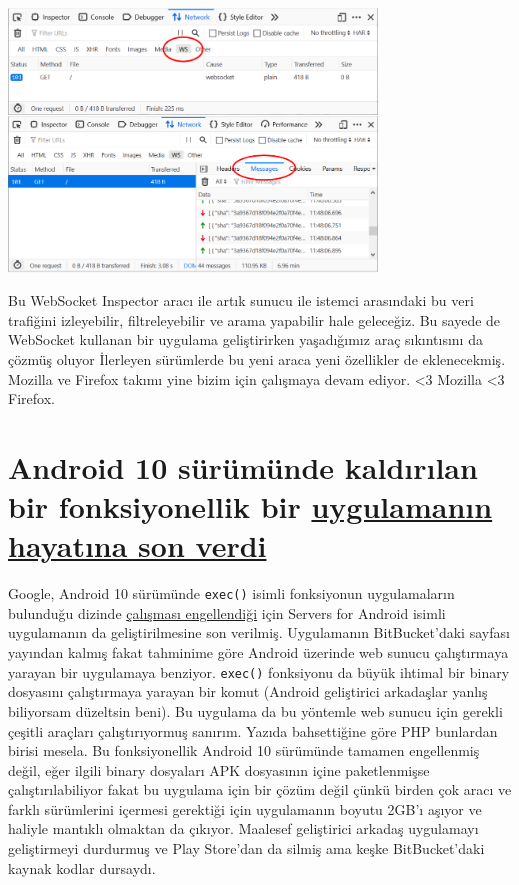 \documentclass[11pt]{article}
\begin{document}
\begin{center}
\includegraphics[height=7cm]{gorseller/websocket-inspector.png}
\end{center}

Bu WebSocket Inspector aracı ile artık sunucu ile istemci arasındaki bu veri
trafiğini izleyebilir, filtreleyebilir ve arama yapabilir hale geleceğiz. Bu
sayede de WebSocket kullanan bir uygulama geliştirirken yaşadığımız araç
sıkıntısını da çözmüş oluyor İlerleyen sürümlerde bu yeni araca yeni özellikler
de eklenecekmiş. Mozilla ve Firefox takımı yine bizim için çalışmaya devam
ediyor. <3 Mozilla <3 Firefox.
\section{Android 10 sürümünde kaldırılan bir fonksiyonellik bir \href{https://bitbucket.org/esminis/server/wiki/Home}{uygulamanın hayatına son verdi}}
\label{sec:org8296556}
Google, Android 10 sürümünde \texttt{exec()} isimli fonksiyonun uygulamaların
bulunduğu dizinde \href{https://issuetracker.google.com/issues/128554619}{çalışması engellendiği} için Servers for Android isimli
uygulamanın da geliştirilmesine son verilmiş. Uygulamanın BitBucket'daki
sayfası yayından kalmış fakat tahminime göre Android üzerinde web sunucu
çalıştırmaya yarayan bir uygulamaya benziyor. \texttt{exec()} fonksiyonu da büyük
ihtimal bir binary dosyasını çalıştırmaya yarayan bir komut (Android
geliştirici arkadaşlar yanlış biliyorsam düzeltsin beni). Bu uygulama da bu
yöntemle web sunucu için gerekli çeşitli araçları çalıştırıyormuş sanırım.
Yazıda bahsettiğine göre PHP bunlardan birisi mesela. Bu fonksiyonellik Android
10 sürümünde tamamen engellenmiş değil, eğer ilgili binary dosyaları APK
dosyasının içine paketlenmişse çalıştırılabiliyor fakat bu uygulama için bir
çözüm değil çünkü birden çok aracı ve farklı sürümlerini içermesi gerektiği
için uygulamanın boyutu 2GB'ı aşıyor ve haliyle mantıklı olmaktan da çıkıyor.
Maalesef geliştirici arkadaş uygulamayı geliştirmeyi durdurmuş ve Play
Store'dan da silmiş ama keşke BitBucket'daki kaynak kodlar dursaydı.
\end{document}
